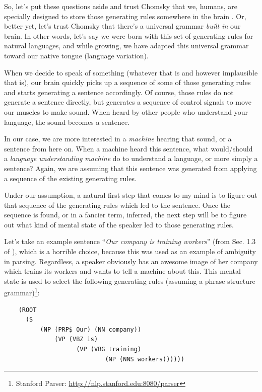 \documentclass{report}
\begin{document}
So, let's put these questions aside and trust Chomsky that we, humans, are
specially designed to store those generating rules somewhere in the brain
\cite{chomsky1959review,carnie2013syntax}. Or, better yet, let's trust Chomsky
that there's a universal grammar {\it built in} our brain. In other words, let's
say we were born with this set of generating rules for natural languages, and
while growing, we have adapted this universal grammar toward our native tongue
(language variation).

When we decide to speak of something (whatever that is and however implausible
that is), our brain quickly picks up a sequence of some of those generating
rules and starts generating a sentence accordingly. Of course, those rules do
not generate a sentence directly, but generates a sequence of control signals to
move our muscles to make sound. When heard by other people who understand your
language, the sound becomes a sentence.

In our case, we are more interested in a {\it machine} hearing that sound, or a
sentence from here on. When a machine heard this sentence, what would/should a
{\it language understanding machine} do to understand a language, or more simply
a sentence? Again, we are assuming that this sentence was generated from
applying a sequence of the existing generating rules. 

Under our assumption, a natural first step that comes to my mind is to figure
out that sequence of the generating rules which led to the sentence. Once the
sequence is found, or in a fancier term, inferred, the next step will be to
figure out what kind of mental state of the speaker led to those generating
rules. 

Let's take an example sentence ``{\it Our company is training workers}'' (from
Sec. 1.3 of \cite{manning1999foundations}), which is a horrible choice, because
this was used as an example of ambiguity in parsing. Regardless, a speaker
obviously has an awesome image of her company which trains its workers and wants
to tell a machine about this. This mental state is used to select the following
generating rules (assuming a phrase structure grammar)\footnote{
    Stanford Parser: \url{http://nlp.stanford.edu:8080/parser}
}:
\begin{verbatim}
    (ROOT
      (S
          (NP (PRP$ Our) (NN company))
              (VP (VBZ is)
                    (VP (VBG training)
                            (NP (NNS workers))))))
\end{verbatim}
\end{document}
